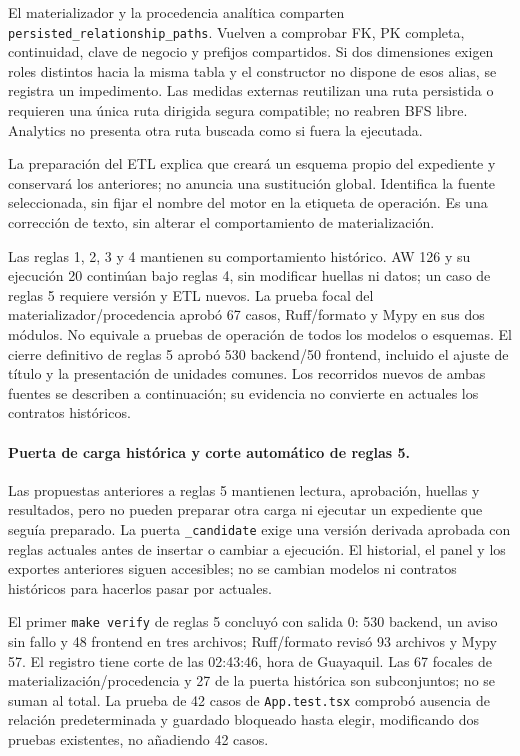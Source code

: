 \documentclass[11pt,letterpaper]{article}
\newcommand{\file}[1]{\texttt{#1}}
\begin{document}
El materializador y la procedencia analítica comparten
\file{persisted\_relationship\_paths}. Vuelven a comprobar FK, PK completa,
continuidad, clave de negocio y prefijos compartidos. Si dos dimensiones exigen
roles distintos hacia la misma tabla y el constructor no dispone de esos alias,
se registra un impedimento. Las medidas externas reutilizan una ruta persistida
o requieren una única ruta dirigida segura compatible; no reabren BFS libre.
Analytics no presenta otra ruta buscada como si fuera la ejecutada.

La preparación del ETL explica que creará un esquema propio del expediente y
conservará los anteriores; no anuncia una sustitución global. Identifica la
fuente seleccionada, sin fijar el nombre del motor en la etiqueta de operación.
Es una corrección de texto, sin alterar el comportamiento de materialización.

Las reglas 1, 2, 3 y 4 mantienen su comportamiento histórico. AW 126 y su ejecución
20 continúan bajo reglas 4, sin modificar huellas ni datos; un caso de reglas 5
requiere versión y ETL nuevos. La prueba focal del materializador/procedencia
aprobó 67 casos, Ruff/formato y Mypy en sus dos módulos. No equivale a pruebas de operación de todos los modelos o esquemas.
El cierre definitivo de reglas 5 aprobó 530 backend/50 frontend, incluido el
ajuste de título y la presentación de unidades comunes. Los recorridos nuevos
de ambas fuentes se describen a continuación; su evidencia no convierte en
actuales los contratos históricos.

\paragraph{Puerta de carga histórica y corte automático de reglas 5.}
Las propuestas anteriores a reglas 5 mantienen lectura, aprobación, huellas y
resultados, pero no pueden preparar otra carga ni ejecutar un expediente que
seguía preparado. La puerta \file{\_candidate} exige una versión derivada aprobada
con reglas actuales antes de insertar o cambiar a ejecución. El historial, el
panel y los exportes anteriores siguen accesibles; no se cambian modelos ni
contratos históricos para hacerlos pasar por actuales.

El primer \file{make verify} de reglas 5 concluyó con salida 0: 530 backend,
un aviso sin fallo y 48 frontend en tres archivos; Ruff/formato revisó 93 archivos y Mypy 57.
El registro  tiene corte de las 02:43:46,
hora de Guayaquil. Las 67 focales de materialización/procedencia y 27 de la puerta
histórica son subconjuntos; no se suman al total. La prueba de 42 casos de
\file{App.test.tsx} comprobó ausencia de relación predeterminada y guardado
bloqueado hasta elegir, modificando dos pruebas existentes, no añadiendo 42 casos.
\end{document}
